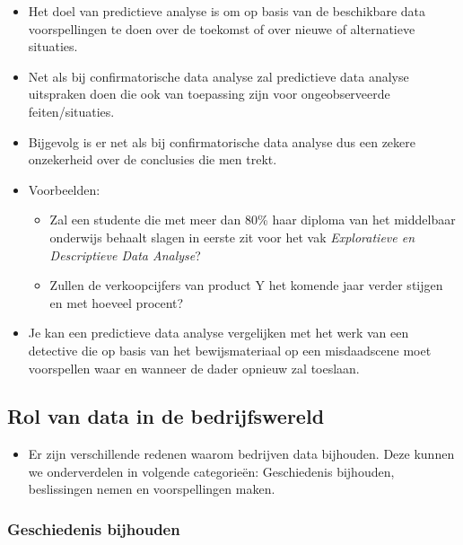 \documentclass[]{tufte-book}
\providecommand{\tightlist}{%
  \setlength{\itemsep}{0pt}\setlength{\parskip}{0pt}}
\begin{document}
\begin{itemize}
\tightlist
\item
  Het doel van predictieve analyse is om op basis van de beschikbare data voorspellingen te doen over de toekomst of over nieuwe of alternatieve situaties.
\item
  Net als bij confirmatorische data analyse zal predictieve data analyse uitspraken doen die ook van toepassing zijn voor ongeobserveerde feiten/situaties.
\item
  Bijgevolg is er net als bij confirmatorische data analyse dus een zekere onzekerheid over de conclusies die men trekt.
\item
  Voorbeelden:

  \begin{itemize}
  \tightlist
  \item
    Zal een studente die met meer dan 80\% haar diploma van het middelbaar onderwijs behaalt slagen in eerste zit voor het vak \emph{Exploratieve en Descriptieve Data Analyse}?
  \item
    Zullen de verkoopcijfers van product Y het komende jaar verder stijgen en met hoeveel procent?
  \end{itemize}
\item
  Je kan een predictieve data analyse vergelijken met het werk van een detective die op basis van het bewijsmateriaal op een misdaadscene moet voorspellen waar en wanneer de dader opnieuw zal toeslaan.
\end{itemize}

\hypertarget{rol-van-data-in-de-bedrijfswereld}{%
\subsection{Rol van data in de bedrijfswereld}\label{rol-van-data-in-de-bedrijfswereld}}

\begin{itemize}
\tightlist
\item
  Er zijn verschillende redenen waarom bedrijven data bijhouden. Deze kunnen we onderverdelen in volgende categorieën: Geschiedenis bijhouden, beslissingen nemen en voorspellingen maken.
\end{itemize}

\hypertarget{geschiedenis-bijhouden}{%
\subsubsection*{Geschiedenis bijhouden}\label{geschiedenis-bijhouden}}
\end{document}
